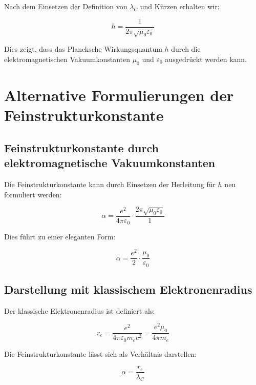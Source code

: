 \documentclass{article}
\begin{document}
	Nach dem Einsetzen der Definition von $\lambda_C$ und Kürzen erhalten wir:
	
	\begin{equation}
		h = \frac{1}{2\pi\sqrt{\mu_0\varepsilon_0}}
	\end{equation}
	
	Dies zeigt, dass das Plancksche Wirkungsquantum $h$ durch die elektromagnetischen Vakuumkonstanten $\mu_0$ und $\varepsilon_0$ ausgedrückt werden kann.
	
	\section{Alternative Formulierungen der Feinstrukturkonstante}
	
	\subsection{Feinstrukturkonstante durch elektromagnetische Vakuumkonstanten}
	
	Die Feinstrukturkonstante kann durch Einsetzen der Herleitung für $h$ neu formuliert werden:
	
	\begin{equation}
		\alpha = \frac{e^2}{4\pi\varepsilon_0} \cdot \frac{2\pi\sqrt{\mu_0\varepsilon_0}}{1}
	\end{equation}
	
	Dies führt zu einer eleganten Form:
	
	\begin{equation}
		\alpha = \frac{e^2}{2} \cdot \frac{\mu_0}{\varepsilon_0}
	\end{equation}
	
	\subsection{Darstellung mit klassischem Elektronenradius}
	
	Der klassische Elektronenradius ist definiert als:
	
	\begin{equation}
		r_e = \frac{e^2}{4\pi\varepsilon_0 m_e c^2} = \frac{e^2\mu_0}{4\pi m_e}
	\end{equation}
	
	Die Feinstrukturkonstante lässt sich als Verhältnis darstellen:
	
	\begin{equation}
		\alpha = \frac{r_e}{\lambda_C}
	\end{equation}
	
\end{document}
